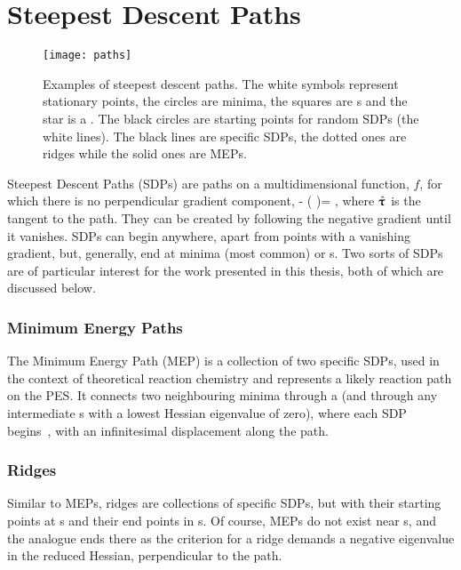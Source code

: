 \section{Steepest Descent Paths}
\label{sec:sdps}
\begin{figure}[h]
  \begin{center}
    \texttt{[image: paths]}
    \parbox{0.85\linewidth}{
      \caption{Examples of steepest descent paths.
The white symbols represent stationary points, the circles are minima, the squares are s and the star is a .
The black circles are starting points for random SDPs (the white lines).
The black lines are specific SDPs, the dotted ones are ridges while the solid ones are MEPs.
      }
      \label{fig:paths}
    }
  \end{center}
\end{figure}

Steepest Descent Paths (SDPs) are paths on a multidimensional function, $f$, for which there is no perpendicular gradient component,
\nabla {} - (\nabla {} \cdot \uvt)\uvt = ,
\eeq
where $\hat{{\mathrm{\mathbf{\bm{\uptau}}}}}$ is the tangent to the path.
They can be created by following the negative gradient until it vanishes.
SDPs can begin anywhere, apart from points with a vanishing gradient, but, generally, end at minima (most common) or \sap{}s.
Two sorts of SDPs are of particular interest for the work presented in this thesis, both of which are discussed below.

\subsubsection{Minimum Energy Paths}
The Minimum Energy Path (MEP) is a collection of two specific SDPs, used in the context of theoretical reaction chemistry and represents a likely reaction path on the PES.
It connects two neighbouring minima through a  (and through any intermediate s with a lowest Hessian eigenvalue of zero), where each SDP begins~\cite{neb-polemic-henkelman1}, with an infinitesimal displacement along the path.

\subsubsection{Ridges}
Similar to MEPs, ridges are collections of specific SDPs, but with their starting points at s and their end points in s.
Of course, MEPs do not exist near s, and the analogue ends there as the criterion for a ridge demands a negative eigenvalue in the reduced Hessian, perpendicular to the path.
